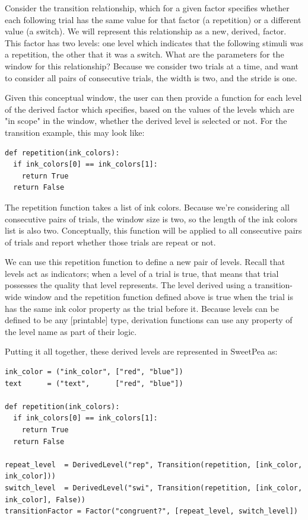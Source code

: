 Consider the transition relationship, which for a given factor specifies whether each following trial has the same value for that factor (a repetition) or a different value (a switch). We will represent this relationship as a new, derived, factor. This factor has two levels: one level which indicates that the following stimuli was a repetition, the other that it was a switch. What are the parameters for the window for this relationship? Because we consider two trials at a time, and want to consider all pairs of consecutive trials, the width is two, and the stride is one.

Given this conceptual window, the user can then provide a function for each level of the derived factor which specifies, based on the values of the levels which are "in scope" in the window, whether the derived level is selected or not. For the transition example, this may look like:

\begin{verbatim}
def repetition(ink_colors):
  if ink_colors[0] == ink_colors[1]:
    return True
  return False
\end{verbatim}

The repetition function takes a list of ink colors. Because we're considering all consecutive pairs of trials, the window size is two, so the length of the ink colors list is also two. Conceptually, this function will be applied to all consecutive pairs of trials and report whether those trials are repeat or not.

We can use this repetition function to define a new pair of levels. Recall that levels act as indicators; when a level of a trial is true, that means that trial possesses the quality that level represents. The level derived using a transition-wide window and the repetition function defined above is true when the trial is has the same ink color property as the trial before it. Because levels can be defined to be any [printable] type, derivation functions can use any property of the level name as part of their logic.

Putting it all together, these derived levels are represented in SweetPea as:

\begin{verbatim}
ink_color = ("ink_color", ["red", "blue"])
text      = ("text",      ["red", "blue"])

def repetition(ink_colors):
  if ink_colors[0] == ink_colors[1]:
    return True
  return False

repeat_level  = DerivedLevel("rep", Transition(repetition, [ink_color, ink_color]))
switch_level  = DerivedLevel("swi", Transition(repetition, [ink_color, ink_color], False))
transitionFactor = Factor("congruent?", [repeat_level, switch_level])

\end{verbatim}

